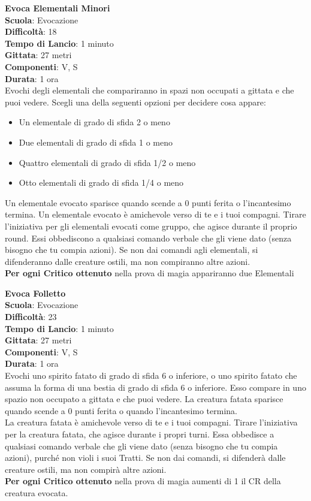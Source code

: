 \begin{multicols}{2}
\medskip\textbf{Evoca Elementali Minori}\\
\textbf{Scuola}: Evocazione\\
\textbf{Difficoltà}:  18\\
\textbf{Tempo di Lancio}: 1 minuto\\
\textbf{Gittata}: 27 metri\\
\textbf{Componenti}: V, S\\
\textbf{Durata}: 1 ora\\
Evochi degli elementali che compariranno in spazi non occupati a gittata e che puoi vedere. Scegli una della seguenti opzioni per decidere cosa appare:
\begin{itemize}
\item Un elementale di grado di sfida 2 o meno
\item Due elementali di grado di sfida 1 o meno
\item Quattro elementali di grado di sfida 1/2 o meno
\item Otto elementali di grado di sfida 1/4 o meno
\end{itemize}
\medskip
Un elementale evocato sparisce quando scende a 0 punti ferita o l'incantesimo termina. Un elementale evocato è amichevole verso di te e i tuoi compagni. Tirare l’iniziativa per gli elementali evocati come gruppo, che agisce durante il proprio round. Essi obbediscono a qualsiasi comando verbale che gli viene dato (senza bisogno che tu compia azioni). Se non dai comandi agli elementali, si difenderanno dalle creature ostili, ma non compiranno altre azioni.\\
\textbf{Per ogni Critico ottenuto} nella prova di magia appariranno due Elementali

\medskip\textbf{Evoca Folletto}\\
\textbf{Scuola}: Evocazione\\
\textbf{Difficoltà}:  23\\
\textbf{Tempo di Lancio}: 1 minuto\\
\textbf{Gittata}: 27 metri\\
\textbf{Componenti}: V, S\\
\textbf{Durata}: 1 ora \\
Evochi uno spirito fatato di grado di sfida 6 o inferiore, o uno spirito fatato che assuma la forma di una bestia di grado di sfida 6 o inferiore. Esso compare in uno spazio non occupato a gittata e che puoi vedere. La creatura fatata sparisce quando scende a 0 punti ferita o quando l'incantesimo termina.\\
La creatura fatata è amichevole verso di te e i tuoi compagni. Tirare l’iniziativa per la creatura fatata, che agisce durante i propri turni. Essa obbedisce a qualsiasi comando verbale che gli viene dato (senza bisogno che tu compia azioni), purché non violi i suoi Tratti. Se non dai comandi, si difenderà dalle creature ostili, ma non compirà altre azioni.\\
\textbf{Per ogni Critico ottenuto} nella prova di magia aumenti di 1 il CR della creatura evocata.


\end{multicols}
